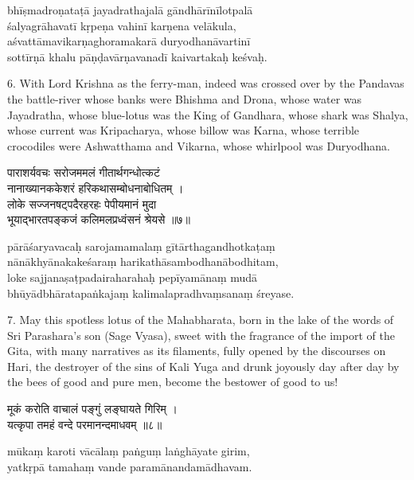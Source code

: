 \begin{transliteration}
bhīṣmadroṇataṭā jayadrathajalā gāndhārīnīlotpalā \\
\tab śalyagrāhavatī kṛpeṇa vahinī karṇena velākula, \\
aśvattāmavikarṇaghoramakarā duryodhanāvartinī \\
\tab sottīrṇā khalu pāṇḍavārṇavanadī kaivartakaḥ keśvaḥ.
\end{transliteration}

6. With Lord Krishna as the ferry-man, indeed was crossed over by the Pandavas
the battle-river whose banks were Bhishma and Drona, whose water was
Jayadratha, whose blue-lotus was the King of Gandhara, whose shark was Shalya,
whose current was Kripacharya, whose billow was Karna, whose terrible
crocodiles were Ashwatthama and Vikarna, whose whirlpool was Duryodhana.

\begin{gitaverse}
पाराशर्यवचः सरोजममलं गीतार्थगन्धोत्कटं \\
\tab नानाख्यानककेशरं हरिकथासम्बोधनाबोधितम् । \\
लोके सज्जनषट्पदैरहरहः पेपीयमानं मुदा \\
\tab भूयाद्भारतपङ्कजं कलिमलप्रध्वंसनं श्रेयसे ॥७॥
\end{gitaverse}

\begin{transliteration}
pārāśaryavacaḥ sarojamamalaṃ gītārthagandhotkaṭaṃ \\
\tab nānākhyānakakeśaraṃ harikathāsambodhanābodhitam, \\
loke sajjanaṣaṭpadairaharahaḥ pepīyamānaṃ mudā \\
\tab bhūyādbhāratapaṅkajaṃ kalimalapradhvaṃsanaṃ śreyase.
\end{transliteration}

7. May this spotless lotus of the Mahabharata, born in the lake of the words of
Sri Parashara's son (Sage Vyasa), sweet with the fragrance of the import of the
Gita, with many narratives as its filaments, fully opened by the discourses on
Hari, the destroyer of the sins of Kali Yuga and drunk joyously day after day
by the bees of good and pure men, become the bestower of good to us!

\begin{gitaverse}
मूकं करोति वाचालं पङ्गुं लङ्घायते गिरिम् । \\
यत्कृपा तमहं वन्दे परमानन्दमाधवम् ॥८॥
\end{gitaverse}

\begin{transliteration}
mūkaṃ karoti vācālaṃ paṅguṃ laṅghāyate girim, \\
yatkṛpā tamahaṃ vande paramānandamādhavam.
\end{transliteration}

